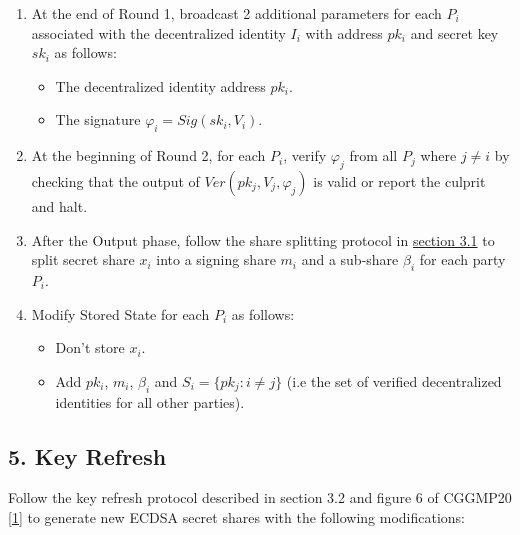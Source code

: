 \documentclass[
]{article}
\providecommand{\tightlist}{%
  \setlength{\itemsep}{0pt}\setlength{\parskip}{0pt}}
\begin{document}
\begin{enumerate}
\def\labelenumi{\arabic{enumi}.}
\tightlist
\item
  At the end of Round 1, broadcast 2 additional parameters for each
  \(P_i\) associated with the decentralized identity \(I_i\) with
  address \(pk_i\) and secret key \(sk_i\) as follows:

  \begin{itemize}
  \tightlist
  \item
    The decentralized identity address \(pk_i\).
  \item
    The signature \(\varphi _i = Sig(sk_i, V_i)\).
  \end{itemize}
\item
  At the beginning of Round 2, for each \(P_i\), verify \(\varphi _j\)
  from all \(P_j\) where \(j \neq i\) by checking that the output of
  \(Ver(pk_j, V_j, \varphi _j)\) is valid or report the culprit and
  halt.
\item
  After the Output phase, follow the share splitting protocol in
  \protect\hyperlink{share-splitting}{section 3.1} to split secret share
  \(x_i\) into a signing share \(m_i\) and a sub-share \(\beta _i\) for
  each party \(P_i\).
\item
  Modify Stored State for each \(P_i\) as follows:

  \begin{itemize}
  \tightlist
  \item
    Don't store \(x_i\).
  \item
    Add \(pk_i\), \(m_i\), \(\beta _i\) and
    \(S_i = \{ pk_j : i \neq j \}\) (i.e the set of verified
    decentralized identities for all other parties).
  \end{itemize}
\end{enumerate}

\hypertarget{key-refresh}{%
\subsection{5. Key Refresh}\label{key-refresh}}

Follow the key refresh protocol described in section 3.2 and figure 6 of
CGGMP20 {[}\protect\hyperlink{ref-cggmp20}{1}{]} to generate new ECDSA
secret shares with the following modifications:
\end{document}
